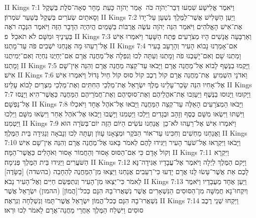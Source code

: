 II Kings 7:1	וַיֹּאמֶר אֱלִישָׁע שִׁמְעוּ דְּבַר־יְהֹוָה כֹּה  אָמַר יְהֹוָה כָּעֵת  מָחָר סְאָה־סֹלֶת בְּשֶׁקֶל וְסָאתַיִם שְׂעֹרִים בְּשֶׁקֶל בְּשַׁעַר שֹׁמְרוֹן׃
II Kings 7:2	וַיַּעַן הַשָּׁלִישׁ אֲשֶׁר־לַמֶּלֶךְ נִשְׁעָן עַל־יָדוֹ אֶת־אִישׁ הָאֱלֹהִים וַיֹּאמַר הִנֵּה יְהֹוָה עֹשֶׂה אֲרֻבּוֹת בַּשָּׁמַיִם הֲיִהְיֶה הַדָּבָר הַזֶּה וַיֹּאמֶר הִנְּכָה רֹאֶה בְּעֵינֶיךָ וּמִשָּׁם לֹא תֹאכֵל׃ {פ}
II Kings 7:3	וְאַרְבָּעָה אֲנָשִׁים הָיוּ מְצֹרָעִים פֶּתַח הַשָּׁעַר וַיֹּאמְרוּ אִישׁ אֶל־רֵעֵהוּ מָה אֲנַחְנוּ יֹשְׁבִים פֹּה עַד־מָתְנוּ׃
II Kings 7:4	אִם־אָמַרְנוּ נָבוֹא הָעִיר וְהָרָעָב בָּעִיר וָמַתְנוּ שָׁם וְאִם־יָשַׁבְנוּ פֹה וָמָתְנוּ וְעַתָּה לְכוּ וְנִפְּלָה אֶל־מַחֲנֵה אֲרָם אִם־יְחַיֻּנוּ נִחְיֶה וְאִם־יְמִיתֻנוּ וָמָתְנוּ׃
II Kings 7:5	וַיָּקֻמוּ בַנֶּשֶׁף לָבוֹא אֶל־מַחֲנֵה אֲרָם וַיָּבֹאוּ עַד־קְצֵה מַחֲנֵה אֲרָם וְהִנֵּה אֵין־שָׁם אִישׁ׃
II Kings 7:6	וַאדֹנָי הִשְׁמִיעַ  אֶת־מַחֲנֵה אֲרָם קוֹל רֶכֶב קוֹל סוּס קוֹל חַיִל גָּדוֹל וַיֹּאמְרוּ אִישׁ אֶל־אָחִיו הִנֵּה שָׂכַר־עָלֵינוּ מֶלֶךְ יִשְׂרָאֵל אֶת־מַלְכֵי הַחִתִּים וְאֶת־מַלְכֵי מִצְרַיִם לָבוֹא עָלֵינוּ׃
II Kings 7:7	וַיָּקוּמוּ וַיָּנוּסוּ בַנֶּשֶׁף וַיַּעַזְבוּ אֶת־אהֳלֵיהֶם וְאֶת־סוּסֵיהֶם וְאֶת־חֲמֹרֵיהֶם הַמַּחֲנֶה כַּאֲשֶׁר־הִיא וַיָּנֻסוּ אֶל־נַפְשָׁם׃
II Kings 7:8	וַיָּבֹאוּ הַמְצֹרָעִים הָאֵלֶּה עַד־קְצֵה הַמַּחֲנֶה וַיָּבֹאוּ אֶל־אֹהֶל אֶחָד וַיֹּאכְלוּ וַיִּשְׁתּוּ וַיִּשְׂאוּ מִשָּׁם כֶּסֶף וְזָהָב וּבְגָדִים וַיֵּלְכוּ וַיַּטְמִנוּ וַיָּשֻׁבוּ וַיָּבֹאוּ אֶל־אֹהֶל אַחֵר וַיִּשְׂאוּ מִשָּׁם וַיֵּלְכוּ וַיַּטְמִנוּ׃
II Kings 7:9	וַיֹּאמְרוּ אִישׁ אֶל־רֵעֵהוּ לֹא־כֵן  אֲנַחְנוּ עֹשִׂים הַיּוֹם הַזֶּה יוֹם־בְּשֹׂרָה הוּא וַאֲנַחְנוּ מַחְשִׁים וְחִכִּינוּ עַד־אוֹר הַבֹּקֶר וּמְצָאָנוּ עָווֹן וְעַתָּה לְכוּ וְנָבֹאָה וְנַגִּידָה בֵּית הַמֶּלֶךְ׃
II Kings 7:10	וַיָּבֹאוּ וַיִּקְרְאוּ אֶל־שֹׁעֵר הָעִיר וַיַּגִּידוּ לָהֶם לֵאמֹר בָּאנוּ אֶל־מַחֲנֵה אֲרָם וְהִנֵּה אֵין־שָׁם אִישׁ וְקוֹל אָדָם כִּי אִם־הַסּוּס אָסוּר וְהַחֲמוֹר אָסוּר וְאֹהָלִים כַּאֲשֶׁר־הֵמָּה׃
II Kings 7:11	וַיִּקְרָא הַשֹּׁעֲרִים וַיַּגִּידוּ בֵּית הַמֶּלֶךְ פְּנִימָה׃
II Kings 7:12	וַיָּקם הַמֶּלֶךְ לַיְלָה וַיֹּאמֶר אֶל־עֲבָדָיו אַגִּידָה־נָּא לָכֶם אֵת אֲשֶׁר־עָשׂוּ לָנוּ אֲרָם יָדְעוּ כִּי־רְעֵבִים אֲנַחְנוּ וַיֵּצְאוּ מִן־הַמַּחֲנֶה לְהֵחָבֵה (בהשדה) [בַשָּׂדֶה] לֵאמֹר כִּי־יֵצְאוּ מִן־הָעִיר וְנִתְפְּשֵׂם חַיִּים וְאֶל־הָעִיר נָבֹא׃
II Kings 7:13	וַיַּעַן אֶחָד מֵעֲבָדָיו וַיֹּאמֶר וְיִקְחוּ־נָא חֲמִשָּׁה מִן־הַסּוּסִים הַנִּשְׁאָרִים אֲשֶׁר נִשְׁאֲרוּ־בָהּ הִנָּם כְּכל־[הֲמוֹן] (ההמון) יִשְׂרָאֵל אֲשֶׁר נִשְׁאֲרוּ־בָהּ הִנָּם כְּכל־הֲמוֹן יִשְׂרָאֵל אֲשֶׁר־תָּמּוּ וְנִשְׁלְחָה וְנִרְאֶה׃
II Kings 7:14	וַיִּקְחוּ שְׁנֵי רֶכֶב סוּסִים וַיִּשְׁלַח הַמֶּלֶךְ אַחֲרֵי מַחֲנֵה־אֲרָם לֵאמֹר לְכוּ וּרְאוּ׃
